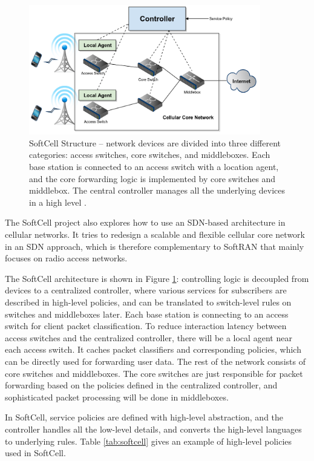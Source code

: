 \documentclass[english]{tktltiki}
\begin{document}
\begin{figure}[htbp]
  \centering
  \includegraphics[width=0.9\textwidth]{images/softcell.png}
  \caption{SoftCell Structure -- network devices are divided into three different categories: access switches, core switches, and middleboxes. Each base station is connected to an access switch with a location agent, and the core forwarding logic is implemented by core switches and middlebox. The central controller manages all the underlying devices in a high level \cite{jlvr13}.}
  \label{fig:softcell}
\end{figure}

The SoftCell project \cite{jlvr13} also explores how to use an SDN-based architecture in cellular networks. It tries to redesign a scalable and flexible cellular core network in an SDN approach, which is therefore complementary to SoftRAN that mainly focuses on radio access networks. 

The SoftCell architecture is shown in Figure \ref{fig:softcell}: controlling logic is decoupled from devices to a centralized controller, where various services for subscribers are described in high-level policies, and can be translated to switch-level rules on switches and middleboxes later. Each base station is connecting to an access switch for client packet classification. To reduce interaction latency between access switches and the centralized controller, there will be a local agent near each access switch. It caches packet classifiers and corresponding policies, which can be directly used for forwarding user data. The rest of the network consists of core switches and middleboxes. The core switches are just responsible for packet forwarding based on the policies defined in the centralized controller, and sophisticated packet processing will be done in middleboxes.

In SoftCell, service policies are defined with high-level abstraction, and the controller handles all the low-level details, and converts the high-level languages to underlying rules. Table \ref{tab:softcell} gives an example of high-level policies used in SoftCell.
\end{document}
